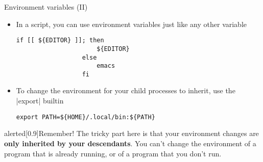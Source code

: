 \begin{frame}[fragile]{Environment variables (II)}
    \vspace{-3mm}
    \begin{itemize}
        \item In a script, you can use environment variables just like any other variable
              \begin{lstlisting}[style=MyBash, numbers=none, aboveskip=2mm, belowskip=-4mm, xrightmargin=30mm]
                  if [[ ${EDITOR} ]]; then
                      ${EDITOR}
                  else
                      emacs
                  fi
              \end{lstlisting}
        \item To change the environment \alert{for your child processes} to inherit, use the \bash|export| builtin
              \begin{lstlisting}[style=MyBash, numbers=none, aboveskip=2mm, xrightmargin=30mm]
                  export PATH=${HOME}/.local/bin:${PATH}
              \end{lstlisting}
    \end{itemize}
    \begin{varblock}{alerted}[0.9\textwidth]{Remember!}
        The tricky part here is that your environment changes are \alert{\textbf{only inherited by your descendants}}.
        You can't change the environment of a program that is already running, or of a program that you don't run. 
    \end{varblock}
\end{frame}
